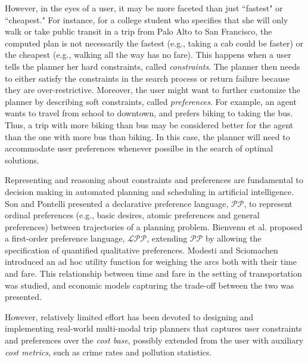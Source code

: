 \documentclass[letterpaper]{article}
\newcommand{\tit}[1]{\textit{#1}}
\begin{document}
However, in the eyes of a user, it may be more faceted than just
``fastest" or ``cheapest."
For instance, for a college student who specifies that she will
only walk or take public transit in a trip from Palo Alto to
San Francisco, the computed plan is not necessarily the fastest
(e.g., taking a cab could be faster)
or the cheapest (e.g., walking all the way has no fare).
This happens when a user tells the planner her hard constraints,
called \tit{constraints}.  
The planner then needs to either satisfy the 
constraints in the search process or return failure because they are
over-restrictive.
Moreover, the user might want to further customize the planner by
describing soft constraints, called \tit{preferences}.
For example, an agent wants to travel from school to
downtown, and prefers biking to taking the bus.
Thus, a trip with more biking than bus may be considered better for
the agent than the one with more bus than biking.
In this case, the planner will need to accommodate user preferences
whenever possilbe in the search of optimal solutions.

Representing and reasoning about constraints and preferences are
fundamental to decision making in automated planning and scheduling
in artificial intelligence.
Son and Pontelli presented a declarative preference language, 
$\mathcal{PP}$, to represent ordinal preferences (e.g., basic desires,
atomic preferences and general preferences) between trajectories of 
a planning problem\cite{son2004planning}.
Bienvenu et al. proposed a first-order preference language, $\mathcal{LPP}$, 
extending $\mathcal{PP}$ by allowing the specification of quantified qualitative
preferences\cite{bienvenu2011specifying}.
Modesti and Sciomachen introduced an ad hoc utility function for weighing
the arcs both with their time and fare\cite{modesti1998utility}.
This relationship between time and fare in the setting of transportation
was studied, and economic models capturing the trade-off between the two
was presented\cite{antoniou2007methodology}.

However, relatively limited effort has been devoted to designing and
implementing real-world multi-modal trip planners that captures user
constraints and preferences over the \tit{cost base}, possibly
extended from the user with auxiliary \tit{cost metrics},
such as crime rates and pollution statistics.
\end{document}
